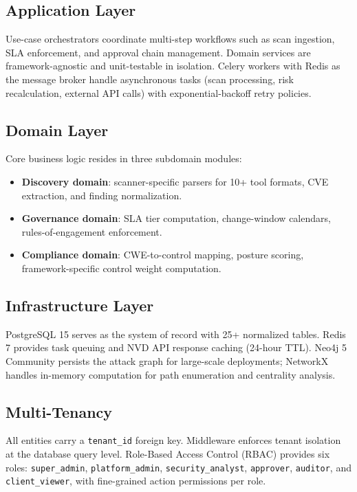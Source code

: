 \documentclass[conference]{IEEEtran}
\begin{document}
\subsection{Application Layer}

Use-case orchestrators coordinate multi-step workflows such as scan ingestion, SLA enforcement, and approval chain management. Domain services are framework-agnostic and unit-testable in isolation. Celery workers with Redis as the message broker handle asynchronous tasks (scan processing, risk recalculation, external API calls) with exponential-backoff retry policies.

\subsection{Domain Layer}

Core business logic resides in three subdomain modules:

\begin{itemize}
  \item \textbf{Discovery domain}: scanner-specific parsers for 10+ tool formats, CVE extraction, and finding normalization.
  \item \textbf{Governance domain}: SLA tier computation, change-window calendars, rules-of-engagement enforcement.
  \item \textbf{Compliance domain}: CWE-to-control mapping, posture scoring, framework-specific control weight computation.
\end{itemize}

\subsection{Infrastructure Layer}

PostgreSQL 15 serves as the system of record with 25+ normalized tables. Redis 7 provides task queuing and NVD API response caching (24-hour TTL). Neo4j 5 Community persists the attack graph for large-scale deployments; NetworkX handles in-memory computation for path enumeration and centrality analysis.

\subsection{Multi-Tenancy}

All entities carry a \texttt{tenant\_id} foreign key. Middleware enforces tenant isolation at the database query level. Role-Based Access Control (RBAC) provides six roles: \texttt{super\_admin}, \texttt{platform\_admin}, \texttt{security\_analyst}, \texttt{approver}, \texttt{auditor}, and \texttt{client\_viewer}, with fine-grained action permissions per role.
\end{document}

